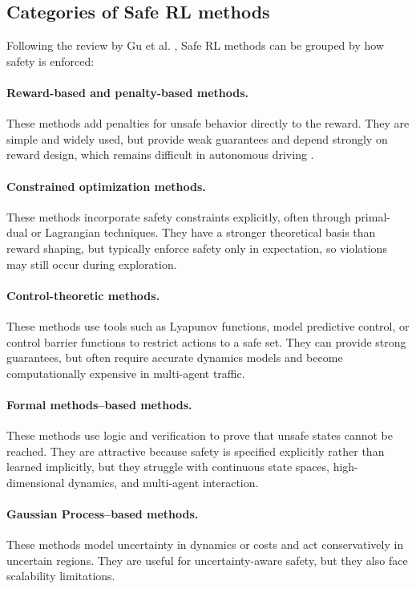 \subsection{Categories of Safe RL methods}

Following the review by Gu et al. \cite{gu2024reviewsafereinforcementlearning}, Safe RL methods can be grouped by how safety is enforced:

\paragraph{Reward-based and penalty-based methods.}
These methods add penalties for unsafe behavior directly to the reward. They are simple and widely used, but provide weak guarantees and depend strongly on reward design, which remains difficult in autonomous driving \cite{kiran2021deepreinforcementlearningautonomous}.

\paragraph{Constrained optimization methods.}
These methods incorporate safety constraints explicitly, often through primal-dual or Lagrangian techniques. They have a stronger theoretical basis than reward shaping, but typically enforce safety only in expectation, so violations may still occur during exploration.

\paragraph{Control-theoretic methods.}
These methods use tools such as Lyapunov functions, model predictive control, or control barrier functions to restrict actions to a safe set. They can provide strong guarantees, but often require accurate dynamics models and become computationally expensive in multi-agent traffic.

\paragraph{Formal methods--based methods.}
These methods use logic and verification to prove that unsafe states cannot be reached. They are attractive because safety is specified explicitly rather than learned implicitly, but they struggle with continuous state spaces, high-dimensional dynamics, and multi-agent interaction.

\paragraph{Gaussian Process--based methods.}
These methods model uncertainty in dynamics or costs and act conservatively in uncertain regions. They are useful for uncertainty-aware safety, but they also face scalability limitations.

